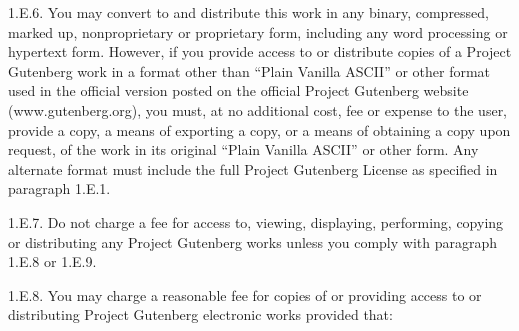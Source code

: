 \documentclass[11pt,openany,oneside]{book}
\begin{document}
1.E.6. You may convert to and distribute this work in any binary, compressed, marked up, nonproprietary or proprietary form, including any word processing or hypertext form. However, if you provide access to or distribute copies of a Project Gutenberg work in a format other than “Plain Vanilla ASCII” or other format used in the official version posted on the official Project Gutenberg website (www.gutenberg.org), you must, at no additional cost, fee or expense to the user, provide a copy, a means of exporting a copy, or a means of obtaining a copy upon request, of the work in its original “Plain Vanilla ASCII” or other form. Any alternate format must include the full Project Gutenberg License as specified in paragraph 1.E.1. 

1.E.7. Do not charge a fee for access to, viewing, displaying, performing, copying or distributing any Project Gutenberg works unless you comply with paragraph 1.E.8 or 1.E.9. 

1.E.8. You may charge a reasonable fee for copies of or providing access to or distributing Project Gutenberg electronic works provided that: 
\end{document}
